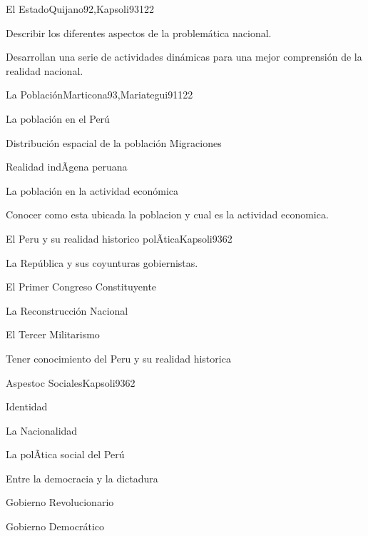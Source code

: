 \begin{syllabus}
\begin{unit}{El Estado}{Quijano92,Kapsoli93}{12}{2}
\begin{unitgoals}
      \item Describir los diferentes aspectos de la problemática nacional.
      \item Desarrollan una serie de actividades dinámicas para una mejor comprensión de la realidad nacional.
   \end{unitgoals}
\end{unit}

\begin{unit}{La Población}{Marticona93,Mariategui91}{12}{2}
\begin{topics}
	\item La población en el Perú
	\item Distribución espacial de la población Migraciones
	\item Realidad indÃ­gena peruana
	\item La población en la actividad económica
\end{topics}

\begin{unitgoals}
      \item Conocer como esta ubicada la poblacion y cual es la actividad economica.
   \end{unitgoals}
\end{unit}

\begin{unit}{El Peru y su realidad historico polÃ­tica}{Kapsoli93}{6}{2}
\begin{topics}
	\item La República y sus coyunturas gobiernistas.
	\item El Primer Congreso Constituyente
	\item La Reconstrucción Nacional
	\item El Tercer Militarismo
\end{topics}

\begin{unitgoals}
      \item Tener conocimiento del Peru y su realidad historica
\end{unitgoals}
\end{unit}

\begin{unit}{Aspestoc Sociales}{Kapsoli93}{6}{2}
\begin{topics}
	\item Identidad
	\item La Nacionalidad
	\item La polÃ­tica social del Perú
	\item Entre la democracia y la dictadura
	\item Gobierno Revolucionario
	\item Gobierno Democrático
\end{topics}


\end{unit}
\end{syllabus}
